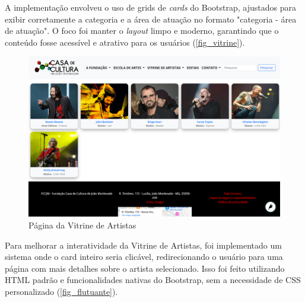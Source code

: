 A implementação envolveu o uso de grids de \textit{cards} do Bootstrap, ajustados para exibir corretamente a categoria e a área de atuação no formato "categoria - área de atuação". O foco foi manter o \textit{layout} limpo e moderno, garantindo que o conteúdo fosse acessível e atrativo para os usuários (\autoref{fig_vitrine}).

\begin{figure}[htb]
	\caption{\label{fig_vitrine}Página da Vitrine de Artistas}
	\begin{center}
	    \includegraphics[scale=0.4]{./img/vitrine_de_artistas.png}
	\end{center}
\end{figure}

Para melhorar a interatividade da Vitrine de Artistas, foi implementado um sistema onde o card inteiro seria clicável, redirecionando o usuário para uma página com mais detalhes sobre o artista selecionado. Isso foi feito utilizando \ac{HTML} padrão e funcionalidades nativas do Bootstrap, sem a necessidade de \ac{CSS} personalizado (\autoref{fig_flutuante}).


